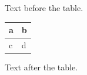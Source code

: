 \documentclass[12pt]{article}
\begin{document}
Text before the table.

\begin{tabular}{ll}\toprule[2pt] a & b\\\midrule[1pt] c & d\\\bottomrule[0.5pt]\end{tabular}

Text after the table.
\end{document}
